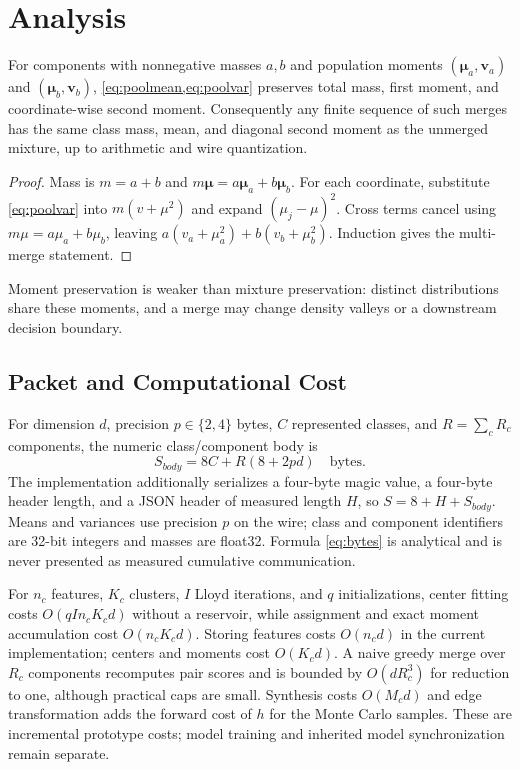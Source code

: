 \section{Analysis}\label{sec:analysis}
\begin{proposition}\label{prop:moments}
For components with nonnegative masses $a,b$ and population moments $(\bm\mu_a,\bm v_a)$ and $(\bm\mu_b,\bm v_b)$, \cref{eq:poolmean,eq:poolvar} preserves total mass, first moment, and coordinate-wise second moment. Consequently any finite sequence of such merges has the same class mass, mean, and diagonal second moment as the unmerged mixture, up to arithmetic and wire quantization.
\end{proposition}
\begin{proof}
Mass is $m=a+b$ and $m\bm\mu=a\bm\mu_a+b\bm\mu_b$. For each coordinate, substitute \cref{eq:poolvar} into $m(v+\mu^2)$ and expand $(\mu_j-\mu)^2$. Cross terms cancel using $m\mu=a\mu_a+b\mu_b$, leaving $a(v_a+\mu_a^2)+b(v_b+\mu_b^2)$. Induction gives the multi-merge statement.
\end{proof}
Moment preservation is weaker than mixture preservation: distinct distributions share these moments, and a merge may change density valleys or a downstream decision boundary.

\subsection{Packet and Computational Cost}
For dimension $d$, precision $p\in\{2,4\}$ bytes, $C$ represented classes, and $R=\sum_cR_c$ components, the numeric class/component body is
\begin{equation}\label{eq:bytes}
S_{body}=8C+R(8+2pd)\quad\text{bytes}.
\end{equation}
The implementation additionally serializes a four-byte magic value, a four-byte header length, and a JSON header of measured length $H$, so $S=8+H+S_{body}$. Means and variances use precision $p$ on the wire; class and component identifiers are 32-bit integers and masses are float32. Formula \cref{eq:bytes} is analytical and is never presented as measured cumulative communication.

For $n_c$ features, $K_c$ clusters, $I$ Lloyd iterations, and $q$ initializations, center fitting costs $O(qIn_cK_cd)$ without a reservoir, while assignment and exact moment accumulation cost $O(n_cK_cd)$. Storing features costs $O(n_cd)$ in the current implementation; centers and moments cost $O(K_cd)$. A naive greedy merge over $R_c$ components recomputes pair scores and is bounded by $O(dR_c^3)$ for reduction to one, although practical caps are small. Synthesis costs $O(M_cd)$ and edge transformation adds the forward cost of $h$ for the Monte Carlo samples. These are incremental prototype costs; model training and inherited model synchronization remain separate.

